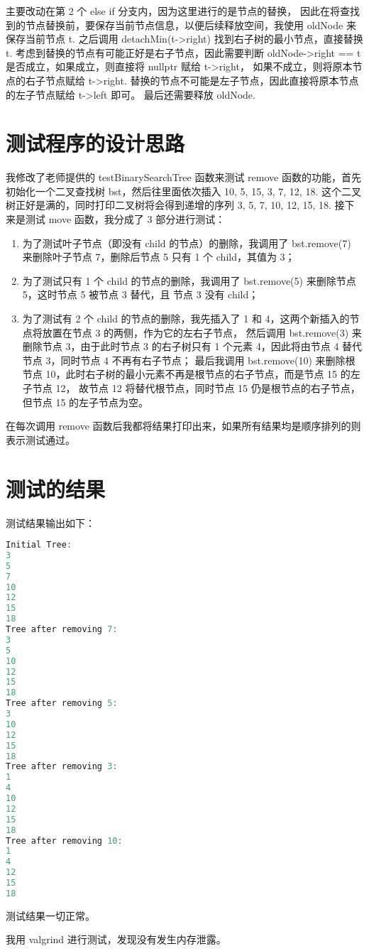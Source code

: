 \documentclass[UTF8]{ctexart}
\begin{document}
主要改动在第 2 个 else if 分支内，因为这里进行的是节点的替换，
因此在将查找到的节点替换前，要保存当前节点信息，以便后续释放空间，我使用 oldNode 来保存当前节点 t. 
之后调用 detachMin(t->right) 找到右子树的最小节点，直接替换 t. 
考虑到替换的节点有可能正好是右子节点，因此需要判断 oldNode->right == t 是否成立，如果成立，则直接将 nullptr 赋给 t->right，
如果不成立，则将原本节点的右子节点赋给 t->right. 替换的节点不可能是左子节点，因此直接将原本节点的左子节点赋给 t->left 即可。
最后还需要释放 oldNode. 


\section{测试程序的设计思路}
我修改了老师提供的 testBinarySearchTree 函数来测试 remove 函数的功能，首先初始化一个二叉查找树 bst，然后往里面依次插入
10, 5, 15, 3, 7, 12, 18. 这个二叉树正好是满的，同时打印二叉树将会得到递增的序列 3, 5, 7, 10, 12, 15, 18. 
接下来是测试 move 函数，我分成了 3 部分进行测试：
\begin{enumerate}
    \item 为了测试叶子节点（即没有 child 的节点）的删除，我调用了 bst.remove(7) 来删除叶子节点 7，删除后节点 5 只有 1 个 child，其值为 3；
    \item 为了测试只有 1 个 child 的节点的删除，我调用了 bst.remove(5) 来删除节点 5，这时节点 5 被节点 3 替代，且 节点 3 没有 child；
    \item 为了测试有 2 个 child 的节点的删除，我先插入了 1 和 4，这两个新插入的节点将放置在节点 3 的两侧，作为它的左右子节点，
然后调用 bst.remove(3) 来删除节点 3，由于此时节点 3 的右子树只有 1 个元素 4，因此将由节点 4 替代节点 3，同时节点 4 不再有右子节点；
最后我调用 bst.remove(10) 来删除根节点 10，此时右子树的最小元素不再是根节点的右子节点，而是节点 15 的左子节点 12，
故节点 12 将替代根节点，同时节点 15 仍是根节点的右子节点，但节点 15 的左子节点为空。
\end{enumerate}

在每次调用 remove 函数后我都将结果打印出来，如果所有结果均是顺序排列的则表示测试通过。


\section{测试的结果}

测试结果输出如下：
\begin{lstlisting}[language=c++, breaklines=true, frame=shadowbox, rulesepcolor=\color{red!20!green!20!blue!20}]
Initial Tree:
3
5
7
10
12
15
18
Tree after removing 7:
3
5
10
12
15
18
Tree after removing 5:
3
10
12
15
18
Tree after removing 3:
1
4
10
12
15
18
Tree after removing 10:
1
4
12
15
18
\end{lstlisting}

测试结果一切正常。

我用 valgrind 进行测试，发现没有发生内存泄露。
\end{document}
